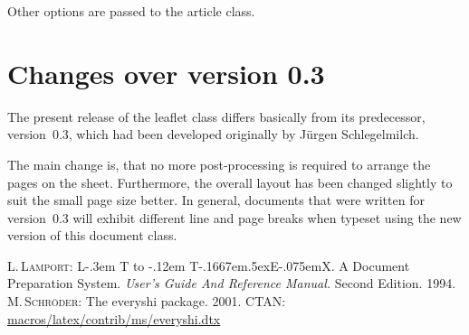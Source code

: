 \documentclass[
]{leaflet}
\makeatletter
\def\ptmTeX{T\kern-.1667em\lower.5ex\hbox{E}\kern-.075emX\@}
\DeclareRobustCommand{\ptmLaTeX}{L\kern-.3em
        {\setbox0\hbox{T}%
         \vbox to\ht0{\hbox{%
                            \csname S@\f@size\endcsname
                            \fontsize\sf@size\z@
                            \math@fontsfalse\selectfont
                            A}%
                      \vss}%
        }%
        \kern-.12em
        \ptmTeX}
\let\LaTeX=\ptmLaTeX
\newcommand\Lpack[1]{\textsf{#1}}
\newcommand\Lclass[1]{\textsf{#1}}
\makeatother
\begin{document}
Other options are passed to the \Lclass{article} class.

\section{Changes over version 0.3}

The present release of the \Lclass{leaflet} class differs basically
from its predecessor, version~0.3, which had been developed originally
by J\"urgen Schlegelmilch.

The main change is, that no more post-processing is required to
arrange the pages on the sheet.
Furthermore, the overall layout has been changed slightly to suit the
small page size better.
In general, documents that were written for version~0.3 will exhibit
different line and page breaks when typeset using the new version of
this document class.

\begin{thebibliography}{000}
  \textsc{L.\,Lamport}: \LaTeX. A Document Preparation System.
  \textit{User's Guide And Reference Manual.} Second Edition. 1994.
  \textsc{M.\,Schr\"oder}: The \Lpack{everyshi} package. 2001.
  CTAN: \url{macros/latex/contrib/ms/everyshi.dtx}
\end{thebibliography}

\loggingall
\end{document}
